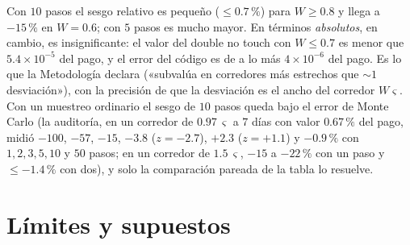 Con $10$ pasos el sesgo relativo es pequeño ($\le0.7\,\%$) para $W\ge0.8$ y llega a $-15\,\%$ en $W=0.6$; con $5$ pasos es mucho mayor. En términos
\emph{absolutos}, en cambio, es insignificante: el valor del double no touch con $W\le0.7$ es menor que $5.4\times10^{-5}$ del pago, y el error del código
es de a lo más $4\times10^{-6}$ del pago. Es lo que la Metodología declara («subvalúa en corredores más estrechos que $\sim1$ desviación»), con la
precisión de que la desviación es el ancho del corredor $W\varsigma$. Con un muestreo ordinario el sesgo de $10$ pasos queda bajo el error de
Monte Carlo (la auditoría, en un corredor de $0.97\,\varsigma$ a $7$ días con valor $0.67\,\%$ del pago, midió $-100$, $-57$, $-15$, $-3.8$ ($z=-2.7$), $+2.3$ ($z=+1.1$) y
$-0.9\,\%$ con $1,2,3,5,10$ y $50$ pasos; en un corredor de $1.5\,\varsigma$, $-15$ a $-22\,\%$ con un paso y $\le-1.4\,\%$ con dos), y solo la comparación pareada de la tabla lo resuelve.

\section{Límites y supuestos}\label{sec:cap15-limites}


